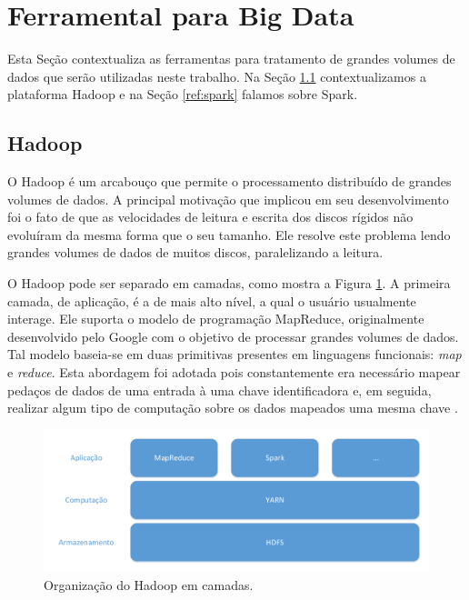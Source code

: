 \section{Ferramental para Big Data}

Esta Seção contextualiza as ferramentas para tratamento de grandes volumes de 
dados que serão utilizadas neste trabalho. Na Seção \ref{ref:hadoop} 
contextualizamos a plataforma Hadoop e na Seção \ref{ref:spark} falamos sobre 
Spark.

\subsection{Hadoop} \label{ref:hadoop}

O Hadoop é um arcabouço que permite o processamento distribuído de 
grandes volumes de dados. A principal motivação que implicou em seu 
desenvolvimento foi o fato de que as velocidades de leitura e escrita dos 
discos rígidos não evoluíram da mesma forma que o seu tamanho. Ele resolve este 
problema lendo grandes volumes de dados de muitos discos, paralelizando a 
leitura.

O Hadoop pode ser separado em camadas, como mostra a Figura \ref{fig:hadoop}. A 
primeira camada, de aplicação,  é a de mais alto nível, a qual o usuário 
usualmente interage. Ele suporta o modelo de programação MapReduce, 
originalmente desenvolvido pelo Google com o objetivo de processar grandes 
volumes de dados. Tal modelo baseia-se em duas primitivas presentes em 
linguagens funcionais: \textit{map} e \textit{reduce}. Esta abordagem  foi 
adotada 
pois constantemente era necessário mapear pedaços de dados de uma entrada à 
uma chave identificadora e, em seguida, realizar algum tipo de 
computação sobre os dados mapeados uma mesma chave \cite{ref:mapreduce}.

\begin{figure}[H]
 \centerline{\includegraphics[width=1\textwidth]{./img/hadoop-layers.pdf}}
 \caption{Organização do Hadoop em camadas.}
 \label{fig:hadoop}
\end{figure}

